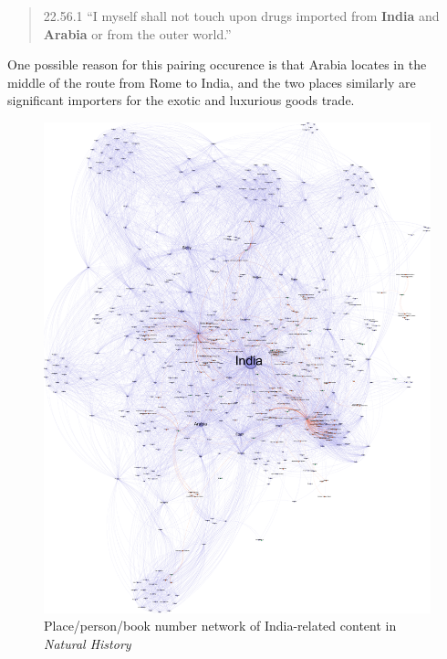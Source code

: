 \documentclass[
  12pt,
]{article}
\begin{document}
\begin{quote}
22.56.1 ``I myself shall not touch upon drugs imported from
\textbf{India} and \textbf{Arabia} or from the outer world.''
\end{quote}

One possible reason for this pairing occurence is that Arabia locates in
the middle of the route from Rome to India, and the two places similarly
are significant importers for the exotic and luxurious goods trade.

\begin{figure}

{\centering \includegraphics{NHthesis_structure_files/mediabag/NHthesis_structure_files/figure-pdf/fig-network_graph-output-1.pdf}

}

\caption{\label{fig-network_graph}Place/person/book number network of
India-related content in \emph{Natural History}}

\end{figure}
\end{document}
